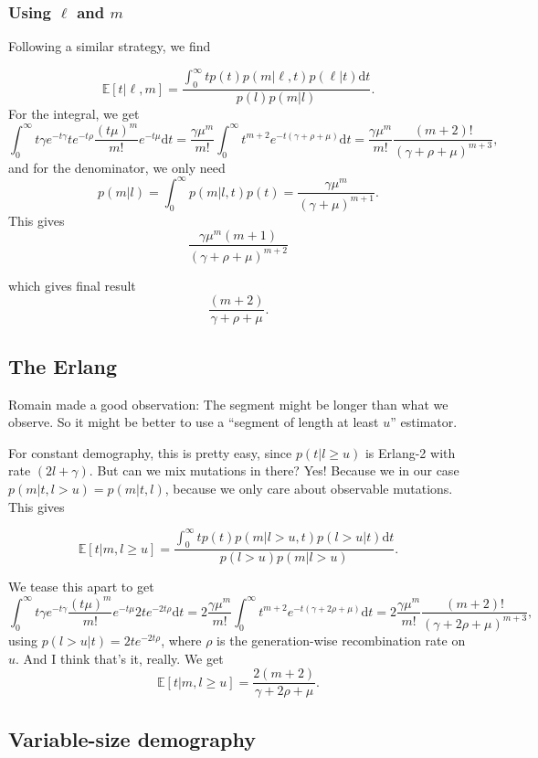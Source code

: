 \documentclass[a4paper]{article}
\newcommand{\E}{\mathbb{E}}
\renewcommand{\d}{\mathrm{d}}
\begin{document}
\subsubsection*{Using $\ell$ and $m$}

Following a similar strategy, we find 

\[
  \E[t|\ell, m] = \frac{
  \int_0^\infty t p(t)p(m|\ell,t) p(\ell|t)\d t }{
  p(l)p(m|l)
}.
\]
For the integral, we get
\[
  \int_0^\infty t \gamma e^{-t\gamma} t e^{-t\rho} \frac{(t\mu)^m}{m!}e^{-t\mu}\d t
  = \frac{\gamma\mu^m}{m!}\int_0^\infty t^{m+2}e^{-t(\gamma + \rho +\mu)}\d t 
  = \frac{\gamma\mu^m}{m!} \frac{(m+2)!}{(\gamma + \rho + \mu)^{m+3}},
\]
and for the denominator, we only need
\[
  p(m|l) = \int_0^\infty p(m|l,t)p(t) = \frac{\gamma\mu^m}{(\gamma + \mu)^{m+1}}.
\]
 This gives
\[
  \frac{\gamma \mu^m (m+1)}{(\gamma + \rho + \mu)^{m+2}}
\]

which gives final result
\[
  \frac{(m+2) }{\gamma + \rho +\mu}.
\]

\subsection*{The Erlang}

Romain made a good observation: The segment might be longer than what we observe. So it might
be better to use a ``segment of length at least $u$'' estimator.

For constant demography, this is pretty easy, since $p(t|l\geq u)$ is Erlang-2 with rate $(2l+ \gamma)$.
But can we mix mutations in there? Yes! Because we in our case $p(m|t, l>u)=p(m|t,l)$, 
because we only care about observable mutations.
This gives

\[
  \E[t|m, l\geq u] = \frac{
  \int_0^\infty t p(t)p(m|l>u,t) p(l>u|t)\d t }{p(l>u)p(m|l>u)}.
\]

We tease this apart to get 
\[
  \int_0^\infty t \gamma e^{-t\gamma}\frac{(t\mu)^m}{m!}e^{-t\mu} 2te^{-2t\rho}\d t
  = 2\frac{\gamma\mu^m}{m!}\int_0^\infty t^{m+2}e^{-t(\gamma + 2\rho +\mu)}\d t 
  = 2\frac{\gamma\mu^m}{m!} \frac{(m+2)!}{(\gamma + 2\rho + \mu)^{m+3}},
\]
using $p(l>u|t) = 2te^{-2t\rho}$, where $\rho$ is the generation-wise recombination rate on $u$.
And I think that's it, really. We get 
\[
  \E[t|m, l\geq u] = \frac{2(m+2)}{\gamma + 2\rho + \mu}.
\]

\subsection*{Variable-size demography}
\end{document}
